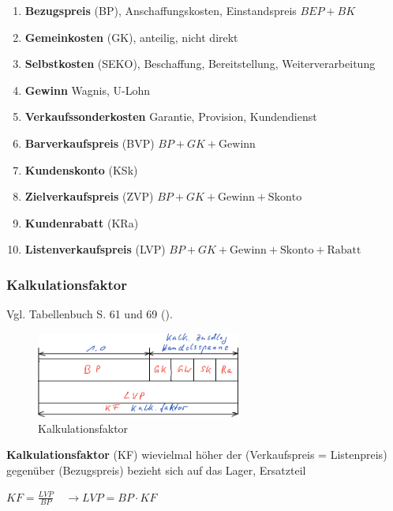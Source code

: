 \begin{enumerate}
\item
  \textbf{Bezugspreis} (BP), Anschaffungskosten, Einstandspreis
  $\boxed{BEP + BK}$
\item
  \textbf{Gemeinkosten} (GK), anteilig, nicht direkt
\item
  \textbf{Selbstkosten} (SEKO), Beschaffung, Bereitstellung,
  Weiterverarbeitung
\item
  \textbf{Gewinn} Wagnis, U-Lohn
\item
  \textbf{Verkaufssonderkosten} Garantie, Provision, Kundendienst
\item
  \textbf{Barverkaufspreis} (BVP) $\boxed{BP + GK + \text{Gewinn}}$
\item
  \textbf{Kundenskonto} (KSk)
\item
  \textbf{Zielverkaufspreis} (ZVP)
  $\boxed{BP + GK + \text{Gewinn} + \text{Skonto}}$
\item
  \textbf{Kundenrabatt} (KRa)
\item
  \textbf{Listenverkaufspreis} (LVP)
  $\boxed{BP + GK + \text{Gewinn} + \text{Skonto} + \text{Rabatt}}$
\end{enumerate}

\subsubsection{Kalkulationsfaktor}\label{kalkulationsfaktor}

Vgl. Tabellenbuch S. 61 und 69 (\textcite{bell:2021:tabellenbuchKfz}).

\begin{figure}[!ht]%
\centering
\includegraphics[width=0.6\textwidth]{images/Skizze/03_Kalkulationsfaktor_Skizze.pdf}
\caption{Kalkulationsfaktor}
\end{figure}

\textbf{Kalkulationsfaktor} (KF) wievielmal höher der (Verkaufspreis =
Listenpreis) gegenüber (Bezugspreis) bezieht sich auf das Lager,
Ersatzteil

$\boxed{KF = \frac{LVP}{BP}} \quad \to \boxed{LVP = BP \cdot KF}$


